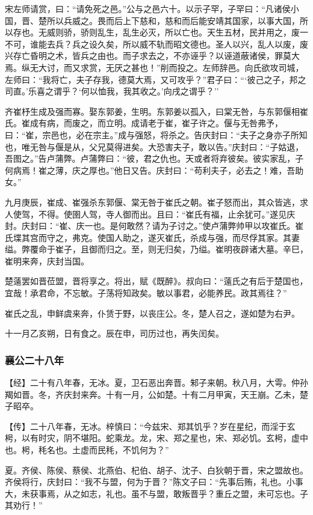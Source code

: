 \documentclass[]{article}
\begin{document}
宋左师请赏，曰：``请免死之邑。''公与之邑六十。以示子罕，子罕曰：``凡诸侯小国，晋、楚所以兵威之。畏而后上下慈和，慈和而后能安靖其国家，以事大国，所以存也。无威则骄，骄则乱生，乱生必灭，所以亡也。天生五材，民并用之，废一不可，谁能去兵？兵之设久矣，所以威不轨而昭文德也。圣人以兴，乱人以废，废兴存亡昏明之术，皆兵之由也。而子求去之，不亦诬乎？以诬道蔽诸侯，罪莫大焉。纵无大讨，而又求赏，无厌之甚也！''削而投之。左师辞邑。向氏欲攻司城，左师曰：``我将亡，夫子存我，德莫大焉，又可攻乎？''君子曰：```彼己之子，邦之司直。'乐喜之谓乎？`何以恤我，我其收之。'向戌之谓乎？''

齐崔杼生成及强而寡。娶东郭姜，生明。东郭姜以孤入，曰棠无咎，与东郭偃相崔氏。崔成有病，而废之，而立明。成请老于崔，崔子许之。偃与无咎弗予，曰：``崔，宗邑也，必在宗主。''成与强怒，将杀之。告庆封曰：``夫子之身亦子所知也，唯无咎与偃是从，父兄莫得进矣。大恐害夫子，敢以告。''庆封曰：``子姑退，吾图之。''告卢蒲弊。卢蒲弊曰：``彼，君之仇也。天或者将弃彼矣。彼实家乱，子何病焉！崔之薄，庆之厚也。''他日又告。庆封曰：``苟利夫子，必去之！难，吾助女。''

九月庚辰，崔成、崔强杀东郭偃、棠无咎于崔氏之朝。崔子怒而出，其众皆逃，求人使驾，不得。使圉人驾，寺人御而出。且曰：``崔氏有福，止余犹可。''遂见庆封。庆封曰：``崔、庆一也。是何敢然？请为子讨之。''使卢蒲弊帅甲以攻崔氏。崔氏堞其宫而守之，弗克。使国人助之，遂灭崔氏，杀成与强，而尽俘其家。其妻缢。弊覆命于崔子，且御而归之。至，则无归矣，乃缢。崔明夜辟诸大墓。辛巳，崔明来奔，庆封当国。

楚薳罢如晋莅盟，晋将享之。将出，赋《既醉》。叔向曰：``薳氏之有后于楚国也，宜哉！承君命，不忘敏。子荡将知政矣。敏以事君，必能养民。政其焉往？''

崔氏之乱，申鲜虞来奔，仆赁于野，以丧庄公。冬，楚人召之，遂如楚为右尹。

十一月乙亥朔，日有食之。辰在申，司历过也，再失闰矣。

\hypertarget{header-n2250}{%
\subsubsection{襄公二十八年}\label{header-n2250}}

【经】二十有八年春，无冰。夏，卫石恶出奔晋。邾子来朝。秋八月，大雩。仲孙羯如晋。冬，齐庆封来奔。十有一月，公如楚。十有二月甲寅，天王崩。乙未，楚子昭卒。

【传】二十八年春，无冰。梓慎曰：``今兹宋、郑其饥乎？岁在星纪，而淫于玄枵，以有时灾，阴不堪阳。蛇乘龙。龙，宋、郑之星也，宋、郑必饥。玄枵，虚中也。枵，秏名也。土虚而民秏，不饥何为？''

夏。齐侯、陈侯、蔡侯、北燕伯、杞伯、胡子、沈子、白狄朝于晋，宋之盟故也。齐侯将行，庆封曰：``我不与盟，何为于晋？''陈文子曰：``先事后贿，礼也。小事大，未获事焉，从之如志，礼也。虽不与盟，敢叛晋乎？重丘之盟，未可忘也。子其劝行！''
\end{document}
